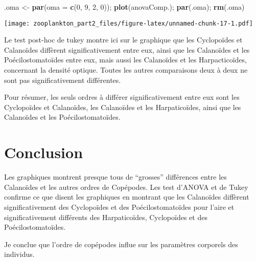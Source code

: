 \documentclass[]{article}
\newenvironment{Shaded}{\begin{snugshade}}{\end{snugshade}}
\newcommand{\KeywordTok}[1]{\textcolor[rgb]{0.13,0.29,0.53}{\textbf{#1}}}
\newcommand{\DataTypeTok}[1]{\textcolor[rgb]{0.13,0.29,0.53}{#1}}
\newcommand{\DecValTok}[1]{\textcolor[rgb]{0.00,0.00,0.81}{#1}}
\newcommand{\StringTok}[1]{\textcolor[rgb]{0.31,0.60,0.02}{#1}}
\newcommand{\NormalTok}[1]{#1}
\begin{document}
\begin{Shaded}
\begin{Highlighting}[]
\NormalTok{.oma <-}\StringTok{ }\KeywordTok{par}\NormalTok{(}\DataTypeTok{oma =} \KeywordTok{c}\NormalTok{(}\DecValTok{0}\NormalTok{, }\DecValTok{9}\NormalTok{, }\DecValTok{2}\NormalTok{, }\DecValTok{0}\NormalTok{)); }\KeywordTok{plot}\NormalTok{(anovaComp.); }\KeywordTok{par}\NormalTok{(.oma); }\KeywordTok{rm}\NormalTok{(.oma)}
\end{Highlighting}
\end{Shaded}

\texttt{[image: zooplankton\_part2\_files/figure-latex/unnamed-chunk-17-1.pdf]}

Le test post-hoc de tukey montre ici sur le graphique que les
Cyclopoïdes et Calanoïdes diffèrent significativement entre eux, ainsi
que les Calanoïdes et les Poécilostomatoïdes entre eux, mais aussi les
Calanoïdes et les Harpacticoïdes, concernant la densité optique. Toutes
les autres comparaisons deux à deux ne sont pas significativement
différentes.

Pour résumer, les seuls ordres à différer significativement entre eux
sont les Cyclopoïdes et Calanoïdes, les Calanoïdes et les Harpaticoïdes,
ainsi que les Calanoïdes et les Poécilostomatoïdes.

\section{Conclusion}\label{conclusion}

Les graphiques montrent presque tous de ``grosses'' différences entre
les Calanoïdes et les autres ordres de Copépodes. Les test d'ANOVA et de
Tukey confirme ce que disent les graphiques en montrant que les
Calanoïdes diffèrent significativement des Cyclopoïdes et des
Poécilostomatoïdes pour l'aire et significativement différents des
Harpaticoïdes, Cyclopoïdes et des Poécilostomatoïdes.

Je conclue que l'ordre de copépodes influe sur les paramètres corporels
des individus.
\end{document}

